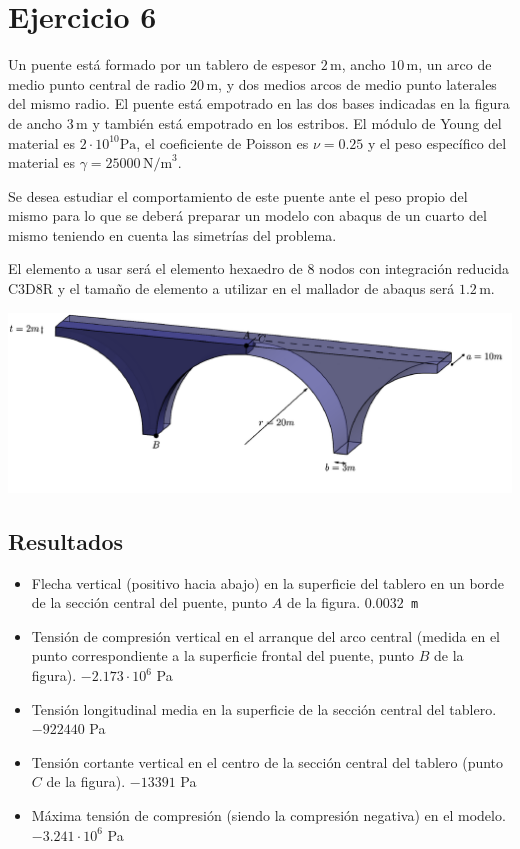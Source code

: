 \documentclass[a4paper,12pt]{article}
\begin{document}
\clearpage
\section{Ejercicio 6}
\label{sec:probprop3}


Un puente está formado por un tablero de espesor $2\,\text{m}$, ancho $10\,\text{m}$, un arco de medio punto central de radio $20\,\text{m}$, y dos 
medios arcos de medio punto laterales del mismo radio. El puente está empotrado en las dos bases indicadas en 
la figura de ancho $3\,\text{m}$ y también está empotrado en los estribos. 
El módulo de Young del material es $2\cdot10^{10} \text{Pa}$, el coeficiente de Poisson es $\nu=0.25$ y el peso específico 
del material es $\gamma=25000\, \text{N/m}^{3}$.

Se desea estudiar el comportamiento de este puente ante el peso propio del mismo para lo que se deberá preparar
un modelo con abaqus de un cuarto del mismo teniendo en cuenta las simetrías del problema.

El elemento a usar será el elemento hexaedro de 8 nodos con integración reducida C3D8R y el tamaño de elemento a utilizar 
en el mallador de abaqus será $1.2\,\text{m}$.

\begin{center}
\includegraphics[width=1.0\textwidth]{puente2.pdf}
\end{center}

\subsection{Resultados}

\begin{itemize}
	\item Flecha vertical (positivo hacia abajo) en la superficie del tablero en un borde de la sección central del puente, 
 punto $A$ de la figura.
    {\tt $0.0032$ m}
\item Tensión de compresión vertical en el arranque del arco central (medida en el punto correspondiente a la superficie frontal 
del puente, punto $B$ de la figura).
    {$-2.173\cdot 10^6$ Pa}
\item Tensión longitudinal media en la superficie de la sección central del tablero.
    {$-922440$ Pa}
\item Tensión cortante vertical en el centro de la sección central del tablero (punto $C$ de la figura).
    {$-13391$ Pa}
\item  Máxima tensión de compresión (siendo la compresión negativa) en el modelo.
    {$-3.241\cdot 10^6$ Pa}
\end{itemize}
\end{document}
